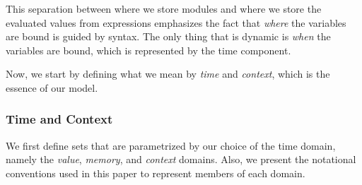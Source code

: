 \documentclass[acmsmall,review]{acmart}\settopmatter{printfolios=true,printccs=false,printacmref=false}
\theoremstyle{definition}
\begin{document}
This separation between where we store modules and where we store the evaluated values from expressions emphasizes the fact that \emph{where} the variables are bound is guided by syntax.
The only thing that is dynamic is \emph{when} the variables are bound, which is represented by the time component.

Now, we start by defining what we mean by \emph{time} and \emph{context}, which is the essence of our model.

\subsubsection{Time and Context}

We first define sets that are parametrized by our choice of the time domain, namely the \emph{value}, \emph{memory}, and \emph{context} domains.
Also, we present the notational conventions used in this paper to represent members of each domain.
\end{document}
